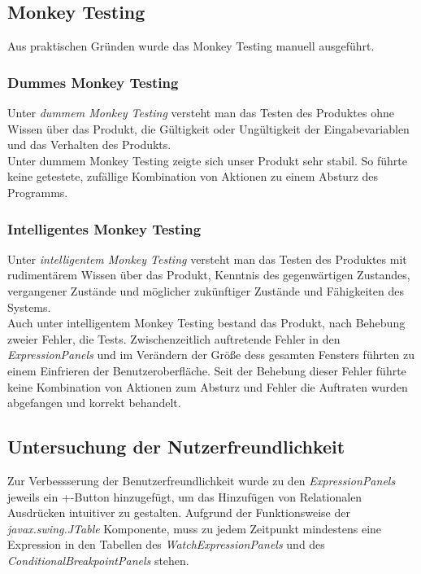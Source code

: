 \documentclass[parskip=full]{scrartcl}
\begin{document}
\subsection{Monkey Testing}
Aus praktischen Gründen wurde das Monkey Testing manuell ausgeführt.
\subsubsection{Dummes Monkey Testing}
Unter \textit{dummem Monkey Testing} versteht man das Testen des Produktes ohne Wissen über das Produkt, die Gültigkeit oder Ungültigkeit der Eingabevariablen und  das Verhalten des Produkts. \\
Unter dummem Monkey Testing zeigte sich unser Produkt sehr stabil. So führte keine getestete, zufällige Kombination von Aktionen zu einem Absturz des Programms. 
\subsubsection{Intelligentes Monkey Testing}
Unter \textit{intelligentem Monkey Testing} versteht man das Testen des Produktes mit rudimentärem Wissen über das Produkt, Kenntnis des gegenwärtigen Zustandes, vergangener Zustände und  möglicher zukünftiger Zustände und Fähigkeiten des Systems. \\
Auch unter intelligentem Monkey Testing bestand das Produkt, nach Behebung zweier Fehler, die Tests. Zwischenzeitlich auftretende Fehler in den \textit{ExpressionPanels} und im Verändern der Größe dess gesamten Fensters führten zu einem Einfrieren der Benutzeroberfläche. Seit der Behebung dieser Fehler führte keine Kombination von Aktionen zum Absturz und Fehler die Auftraten wurden abgefangen und korrekt behandelt.

\subsection{Untersuchung der Nutzerfreundlichkeit}
Zur Verbessserung der Benutzerfreundlichkeit wurde zu den \textit{ExpressionPanels} jeweils ein +-Button hinzugefügt, um das Hinzufügen von Relationalen Ausdrücken intuitiver zu gestalten. Aufgrund der Funktionsweise der \textit{javax.swing.JTable} Komponente, muss zu jedem Zeitpunkt mindestens eine Expression in den Tabellen des \textit{WatchExpressionPanels} und des \textit{ConditionalBreakpointPanels} stehen.
\end{document}
